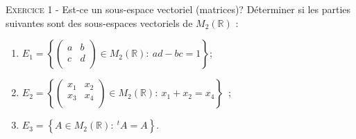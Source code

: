 

\newcommand{\mtn}{\mathbb{N}}
\newcommand{\mtns}{\mathbb{N}^*}
\newcommand{\mtz}{\mathbb{Z}}
\newcommand{\mtr}{\mathbb{R}}
\newcommand{\mtk}{\mathbb{K}}
\newcommand{\mtq}{\mathbb{Q}}
\newcommand{\mtc}{\mathbb{C}}
\newcommand{\mch}{\mathcal{H}}
\newcommand{\mcp}{\mathcal{P}}
\newcommand{\mcb}{\mathcal{B}}
\newcommand{\mcl}{\mathcal{L}}
\newcommand{\mcm}{\mathcal{M}}
\newcommand{\mcc}{\mathcal{C}}
\newcommand{\mcmn}{\mathcal{M}}
\newcommand{\mcmnr}{\mathcal{M}_n(\mtr)}
\newcommand{\mcmnk}{\mathcal{M}_n(\mtk)}
\newcommand{\mcsn}{\mathcal{S}_n}
\newcommand{\mcs}{\mathcal{S}}
\newcommand{\mcd}{\mathcal{D}}
\newcommand{\mcsns}{\mathcal{S}_n^{++}}
\newcommand{\glnk}{GL_n(\mtk)}
\newcommand{\mnr}{\mathcal{M}_n(\mtr)}
\DeclareMathOperator{\ch}{ch}
\DeclareMathOperator{\sh}{sh}
\DeclareMathOperator{\vect}{vect}
\DeclareMathOperator{\card}{card}
\DeclareMathOperator{\comat}{comat}
\DeclareMathOperator{\imv}{Im}
\DeclareMathOperator{\rang}{rg}
\DeclareMathOperator{\Fr}{Fr}
\DeclareMathOperator{\diam}{diam}
\DeclareMathOperator{\supp}{supp}
\newcommand{\veps}{\varepsilon}
\newcommand{\mcu}{\mathcal{U}}
\newcommand{\mcun}{\mcu_n}
\newcommand{\dis}{\displaystyle}
\newcommand{\croouv}{[\![}
\newcommand{\crofer}{]\!]}
\newcommand{\rab}{\mathcal{R}(a,b)}
\newcommand{\pss}[2]{\langle #1,#2\rangle}

 

\begin{center}\textsc{{\huge }}\end{center}



\vskip0.3cm\noindent\textsc{Exercice 1} - Est-ce un sous-espace vectoriel (matrices)?
\vskip0.2cm
Déterminer si les parties suivantes sont des sous-espaces vectoriels de $M_2(\mathbb R)$ : 
\begin{enumerate}
\item $E_1=\left\{\begin{pmatrix}
a & b \\
c & d \\
\end{pmatrix}\in M_2(\mathbb R):\ ad-bc=1\right\}$;
\item $E_2=\left\{\begin{pmatrix}
x_1 & x_2 \\
x_3 & x_4 \\
\end{pmatrix}\in M_2(\mathbb R):\ x_1 + x_2 = x_4\right\}$~;
\item $E_3=\left\{A\in M_2(\mathbb R):\ {}^tA=A\right\}$.
\end{enumerate}


